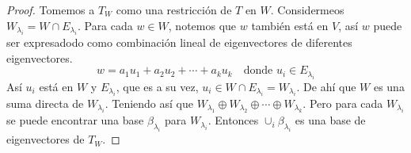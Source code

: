 \documentclass[letterpaper]{article}
\begin{document}
\begin{enumerate}
\begin{proof}
Tomemos a $T_W$ como una restricción de $T$ en $W$. Considermeos $W_{\lambda_i} = W \cap E_{\lambda_i}$. Para cada
$w \in W$, notemos que $w$ también está en $V$, así $w$ puede ser expresadodo como combinación lineal de eigenvectores
de diferentes eigenvectores.
\[
    w = a_1 u_1 + a_2 u_2 + \cdots + a_k u_k \quad\text{donde } u_i \in E_{\lambda_i}
\]
Así $u_i$ está en $W$ y $E_{\lambda_i}$, que es a su vez, $u_i \in W \cap E_{\lambda_i} = W_{\lambda_i}$. De ahí que
$W$ es una suma directa de $W_{\lambda_i}$. Teniendo así que
$W_{\lambda_1} \oplus W_{\lambda_2} \oplus \cdots \oplus W_{\lambda_k}$. Pero para cada $W_{\lambda_i}$ se puede
encontrar una base $\beta_{\lambda_i}$ para $W_{\lambda_i}$. Entonces $\cup_i \beta_{\lambda_i}$ es una base de
eigenvectores de $T_W$.
\end{proof}
\end{enumerate}

\end{document}
